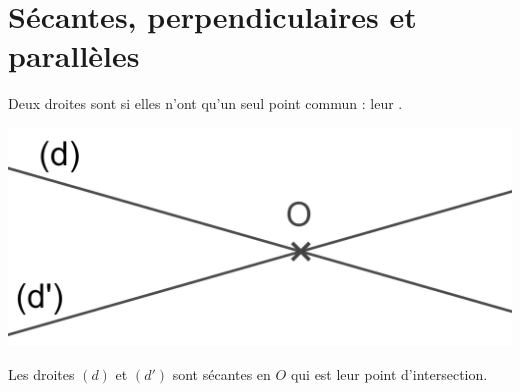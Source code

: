 \documentclass[xcolor={dvipsnames}]{beamer}
\begin{document}
\section{Sécantes, perpendiculaires et parallèles}

\begin{frame}
	\begin{mydef}
			Deux droites sont  \pause si elles n'ont qu'un seul point commun : \pause leur .\pause
		
	\end{mydef}


	\begin{myex}
		
			\begin{center}
				\includegraphics[scale=0.2]{sec}\pause
			\end{center}
		
			Les droites $(d)$ et $(d')$ sont sécantes en $O$ qui est leur point d'intersection.
		
			
	\end{myex}
\end{frame}
\end{document}
